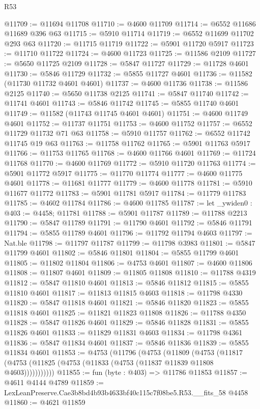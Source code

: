 \begin{lexlean}{R53}
\begin{coremodule}
@11709 := @11694 @11708
@11710 := @4600 @11709
@11714 := @6552 @11686 @11689 @396 @63
@11715 := @5910 @11714
@11719 := @6552 @11699 @11702 @293 @63
@11720 := @11715 @11719
@11722 := @5901 @11720 @5917
@11723 := @11710 @11722
@11724 := @4600 @11723
@11725 := @11586 @2109
@11727 := @5650 @11725 @2109
@11728 := @5847 @11727
@11729 := @11728 @4601
@11730 := @5846 @11729
@11732 := @5855 @11727 @4601
@11736 := @11582 (@11730 @11732 @4601 @4601)
@11737 := @4600 @11736
@11738 := @11586 @2125
@11740 := @5650 @11738 @2125
@11741 := @5847 @11740
@11742 := @11741 @4601
@11743 := @5846 @11742
@11745 := @5855 @11740 @4601
@11749 := @11582 (@11743 @11745 @4601 @4601)
@11751 := @4600 @11749 @4601
@11752 := @11737 @11751
@11753 := @4600 @11752
@11757 := @6552 @11729 @11732 @71 @63
@11758 := @5910 @11757
@11762 := @6552 @11742 @11745 @19 @63
@11763 := @11758 @11762
@11765 := @5901 @11763 @5917
@11766 := @11753 @11765
@11768 := @4600 @11766 @4601
@11769 := @11724 @11768
@11770 := @4600 @11769
@11772 := @5910 @11720 @11763
@11774 := @5901 @11772 @5917
@11775 := @11770 @11774
@11777 := @4600 @11775 @4601
@11778 := @11681 @11777
@11779 := @4600 @11778
@11781 := @5910 @11677 @11772
@11783 := @5901 @11781 @5917
@11784 := @11779 @11783
@11785 := @4602 @11784
@11786 := @4600 @11785
@11787 := let _ywiden0 : @403 := @4458; @11781
@11788 := @5901 @11787
@11789 := @11788 @2213
@11790 := @5847 @11789
@11791 := @11790 @4601
@11792 := @5846 @11791
@11794 := @5855 @11789 @4601
@11796 := @11792 @11794 @4603
@11797 := Nat.ble
@11798 := @11797 @11787
@11799 := @11798 @3983
@11801 := @5847 @11799 @4601
@11802 := @5846 @11801
@11804 := @5855 @11799 @4601
@11805 := @11802 @11804
@11806 := @4753 @4601
@11807 := @4600 @11806
@11808 := @11807 @4601
@11809 := @11805 @11808
@11810 := @11788 @4319
@11812 := @5847 @11810 @4601
@11813 := @5846 @11812
@11815 := @5855 @11810 @4601
@11817 := @11813 @11815 @4603
@11818 := @11798 @4330
@11820 := @5847 @11818 @4601
@11821 := @5846 @11820
@11823 := @5855 @11818 @4601
@11825 := @11821 @11823 @11808
@11826 := @11788 @4350
@11828 := @5847 @11826 @4601
@11829 := @5846 @11828
@11831 := @5855 @11826 @4601
@11833 := @11829 @11831 @4603
@11834 := @11798 @4361
@11836 := @5847 @11834 @4601
@11837 := @5846 @11836
@11839 := @5855 @11834 @4601
@11853 := @4753
    (@11796
      (@4753
        (@11809
          (@4753 (@11817 (@4753 (@11825 (@4753 (@11833 (@4753 (@11837 @11839 @11808 @4603)))))))))))
@11855 := fun (byte : @403) => @11786 @11853
@11857 := @4611 @4144 @4789
@11859 := LexLeanPreserve.Cae3b8bd4b93b4633bf40c115c7f08be5.R53.__fits_58 @4458
@11860 := @4621 @11859

\end{coremodule}
\end{lexlean}
